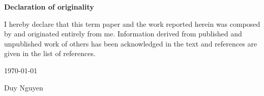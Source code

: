 \thispagestyle{plain}
\textbf{Declaration of originality}

\vspace{6pt}

I hereby declare that this term paper and the work reported herein was composed by and originated entirely from me. Information derived from published and unpublished work of others has been acknowledged in the text and references are given in the list of references. 

\begin{flushright}
	\today

	Duy Nguyen
\end{flushright}
